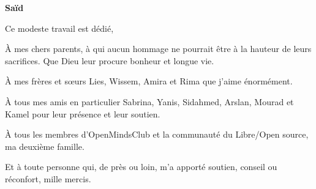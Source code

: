\begin{center}
    \Large
    \textbf{Saïd}
\end{center}

\vspace{1cm}


Ce modeste travail est dédié,

À mes chers parents, à qui aucun hommage ne pourrait être à la hauteur de leurs sacrifices. Que Dieu leur procure bonheur et longue vie.

À mes frères et sœurs Lies, Wissem, Amira et Rima que j'aime énormément.

À tous mes amis en particulier Sabrina, Yanis, Sidahmed, Arslan, Mourad et Kamel pour leur présence et leur soutien.

À tous les membres d'OpenMindsClub et la communauté du Libre/Open source, ma deuxième famille. 

Et à toute personne qui, de près ou loin, m'a apporté soutien, conseil ou réconfort, mille mercis.